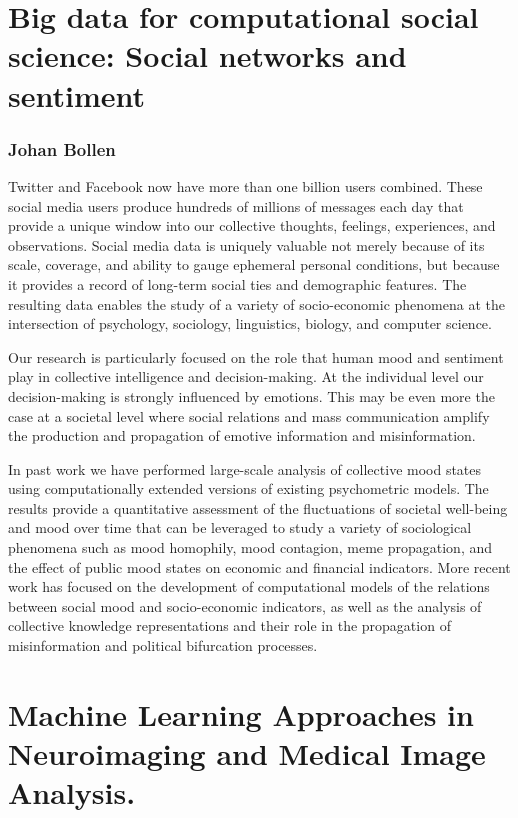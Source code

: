 \documentclass[10pt,letterpaper]{article}
\begin{document}
\section{Big data for computational social science: Social networks and sentiment}
\subsubsection{Johan Bollen}

Twitter and Facebook now have more than one billion users combined. These social
media users produce hundreds of millions of messages each day that provide a
unique window into our collective thoughts, feelings, experiences, and
observations. Social media data is uniquely valuable not merely because of its
scale, coverage, and ability to gauge ephemeral personal conditions, but because
it provides a record of long-term social ties and demographic features. The
resulting data enables the study of a variety of socio-economic phenomena at the
intersection of psychology, sociology, linguistics, biology, and computer
science.

Our research is particularly focused on the role that human mood and sentiment
play in collective intelligence and decision-making. At the individual level our
decision-making is strongly influenced by emotions. This may be even more the
case at a societal level where social relations and mass communication amplify
the production and propagation of emotive information and misinformation.

In past work we have performed large-scale analysis of collective mood states
using computationally extended versions of existing psychometric models. The
results provide a quantitative assessment of the fluctuations of societal
well-being and mood over time that can be leveraged to study a variety of
sociological phenomena such as mood homophily, mood contagion, meme propagation,
and the effect of public mood states on economic and financial indicators. More
recent work has focused on the development of computational models of the
relations between social mood and socio-economic indicators, as well as the
analysis of collective knowledge representations and their role in the
propagation of misinformation and political bifurcation processes.


\section{Machine Learning Approaches in Neuroimaging and Medical Image Analysis.}
\end{document}
